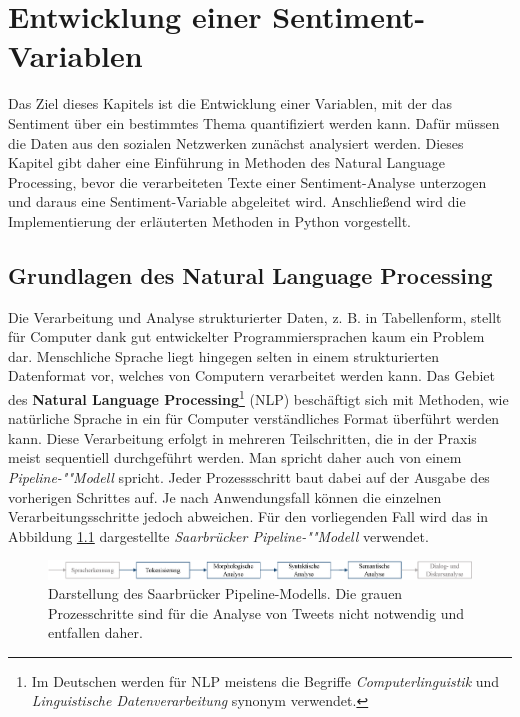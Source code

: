 \documentclass[
	a4paper,
	12pt,
	bibliography=totocnumbered,
	twoside,
]{scrreprt}
\begin{document}
\chapter{Entwicklung einer Sentiment-Variablen}
\label{ch:variable}

Das Ziel dieses Kapitels ist die Entwicklung einer Variablen, mit der das Sentiment über ein bestimmtes Thema quantifiziert werden kann. Dafür müssen die Daten aus den sozialen Netzwerken zunächst analysiert werden. Dieses Kapitel gibt daher eine Einführung in Methoden des Natural Language Processing, bevor die verarbeiteten Texte einer Sentiment-Analyse unterzogen und daraus eine Sentiment-Variable abgeleitet wird. Anschließend wird die Implementierung der erläuterten Methoden in Python vorgestellt.



\section{Grundlagen des Natural Language Processing}
\label{sec:nlp-basics}

Die Verarbeitung und Analyse strukturierter Daten, z. B. in Tabellenform, stellt für Computer dank gut entwickelter Programmiersprachen kaum ein Problem dar. Menschliche Sprache liegt hingegen selten in einem strukturierten Datenformat vor, welches von Computern verarbeitet werden kann. Das Gebiet des \textbf{Natural Language Processing}\footnote{Im Deutschen werden für NLP meistens die Begriffe \textit{Computerlinguistik} und \textit{Linguistische Datenverarbeitung} synonym verwendet.} (NLP) beschäftigt sich mit Methoden, wie natürliche Sprache in ein für Computer verständliches Format überführt werden kann. Diese Verarbeitung erfolgt in mehreren Teilschritten, die in der Praxis meist sequentiell durchgeführt werden. Man spricht daher auch von einem \textit{Pipeline-""Modell} spricht. Jeder Prozessschritt baut dabei auf der Ausgabe des vorherigen Schrittes auf. Je nach Anwendungsfall können die einzelnen Verarbeitungsschritte jedoch abweichen. Für den vorliegenden Fall wird das in Abbildung \ref{img:nlp-pipeline} dargestellte \textit{Saarbrücker Pipeline-""Modell} verwendet.

\begin{figure}[hbt!]
	\centering
	\includegraphics[width=\textwidth]{images/nlp_pipeline_saarbruecken_1line.eps}
	\caption[Saarbrücker Pipeline-Modell]{Darstellung  des Saarbrücker Pipeline-Modells. Die grauen Prozesschritte sind für die Analyse von Tweets nicht notwendig und entfallen daher.}
	\label{img:nlp-pipeline}
\end{figure}
\end{document}

